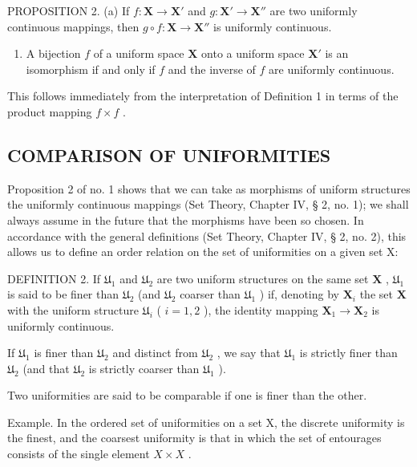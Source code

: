 PROPOSITION 2. (a) If \(f: \mathbf{X} \to \mathbf{X}'\) and \(g: \mathbf{X}' \to \mathbf{X}''\) are two uniformly continuous mappings, then \(g \circ f: \mathbf{X} \to \mathbf{X}''\) is uniformly continuous.

\begin{enumerate}
\def\labelenumi{(\alph{enumi})}
\setcounter{enumi}{1}
\tightlist
\item
  A bijection \(f\) of a uniform space \(\mathbf{X}\) onto a uniform space \(\mathbf{X}'\) is an isomorphism if and only if \(f\) and the inverse of \(f\) are uniformly continuous.
\end{enumerate}

This follows immediately from the interpretation of Definition 1 in terms of the product mapping \(f \times f\) .

\subsection{COMPARISON OF UNIFORMITIES}

Proposition 2 of no. 1 shows that we can take as morphisms of uniform structures the uniformly continuous mappings (Set Theory, Chapter IV, § 2, no. 1); we shall always assume in the future that the morphisms have been so chosen. In accordance with the general definitions (Set Theory, Chapter IV, § 2, no. 2), this allows us to define an order relation on the set of uniformities on a given set X:

DEFINITION 2. If \(\mathfrak{U}_1\) and \(\mathfrak{U}_2\) are two uniform structures on the same set \(\mathbf{X}\) , \(\mathfrak{U}_1\) is said to be finer than \(\mathfrak{U}_2\) (and \(\mathfrak{U}_2\) coarser than \(\mathfrak{U}_1\) ) if, denoting by \(\mathbf{X}_i\) the set \(\mathbf{X}\) with the uniform structure \(\mathfrak{U}_i\) ( \(i = 1,2\) ), the identity mapping \(\mathbf{X}_1 \to \mathbf{X}_2\) is uniformly continuous.

If \(\mathfrak{U}_1\) is finer than \(\mathfrak{U}_2\) and distinct from \(\mathfrak{U}_2\) , we say that \(\mathfrak{U}_1\) is strictly finer than \(\mathfrak{U}_2\) (and that \(\mathfrak{U}_2\) is strictly coarser than \(\mathfrak{U}_1\) ).

Two uniformities are said to be comparable if one is finer than the other.

Example. In the ordered set of uniformities on a set X, the discrete uniformity is the finest, and the coarsest uniformity is that in which the set of entourages consists of the single element \(X \times X\) .

